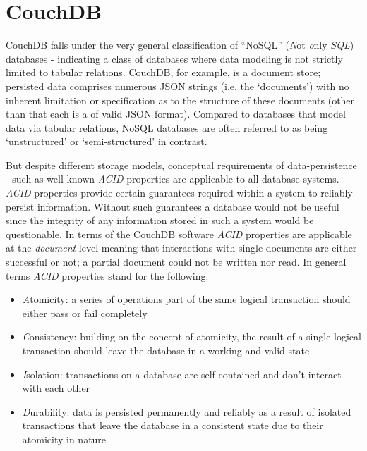 \section{CouchDB}
CouchDB falls under the very general classification of ``NoSQL'' (\textit{N}ot \textit{o}nly \textit{SQL}) databases - indicating a class of databases where data modeling is not strictly limited to tabular relations. CouchDB, for example, is a document store; persisted data comprises numerous JSON strings (i.e. the `documents') with no inherent limitation or specification as to the structure of these documents (other than that each is a of valid JSON format). Compared to databases that model data via tabular relations, NoSQL databases are often referred to as being `unstructured' or `semi-structured' in contrast.

But despite different storage models, conceptual requirements of data-persistence - such as well known \textit{ACID} properties are applicable to all database systems. \textit{ACID} properties provide certain guarantees required within a system to reliably persist information. Without such guarantees a database would not be useful since the integrity of any information stored in such a system would be questionable. In terms of the CouchDB software \textit{ACID} properties are applicable at the \textit{document} level meaning that interactions with single documents are either successful or not; a partial document could not be written nor read. In general terms \textit{ACID} properties stand for the following:

\begin{itemize}
    \item \textit{A}tomicity: a series of operations part of the same logical transaction should either pass or fail completely
    \item \textit{C}onsistency: building on the concept of atomicity, the result of a single logical transaction should leave the database in a working and valid state
    \item \textit{I}solation: transactions on a database are self contained and don't interact with each other
    \item \textit{D}urability: data is persisted permanently and reliably as a result of isolated transactions that leave the database in a consistent state due to their atomicity in nature
\end{itemize}

